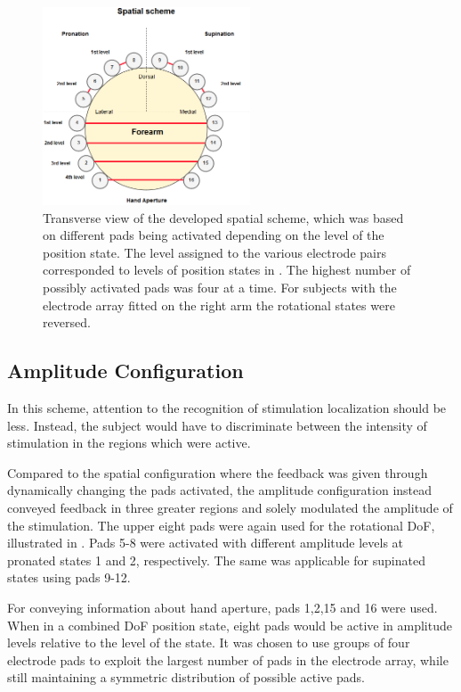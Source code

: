 \begin{figure}[H]                 
	\includegraphics[width=0.55\textwidth]{figures/El_array_spatial}  
	\caption{Transverse view of the developed spatial scheme, which was based on different pads being activated depending on the level of the position state. The level assigned to the various electrode pairs corresponded to levels of position states in . The highest number of possibly activated pads was four at a time. For subjects with the electrode array fitted on the right arm the rotational states were reversed.}
	\label{fig:spatial} 
\end{figure}


\subsection{Amplitude Configuration}

In this scheme, attention to the recognition of stimulation localization should be less. Instead, the subject would have to discriminate between the intensity of stimulation in the regions which were active. 

Compared to the spatial configuration where the feedback was given through dynamically changing the pads activated, the amplitude configuration instead conveyed feedback in three greater regions and solely modulated the amplitude of the stimulation. The upper eight pads were again used for the rotational DoF, illustrated in . Pads 5-8 were activated with different amplitude levels at pronated states 1 and 2, respectively. The same was applicable for supinated states using pads 9-12. 

For conveying information about hand aperture, pads 1,2,15 and 16 were used. When in a combined DoF position state, eight pads would be active in amplitude levels relative to the level of the state. It was chosen to use groups of four electrode pads to exploit the largest number of pads in the electrode array, while still maintaining a symmetric distribution of possible active pads.

